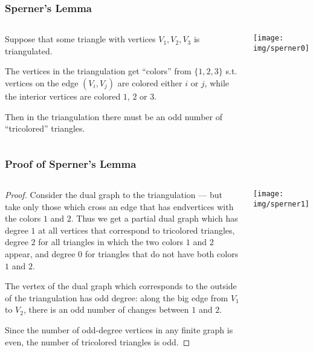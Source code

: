 \documentclass[UTF8,11pt,colorlinks,compress,openany]{beamer}%
\begin{document}
\begin{frame}\frametitle{Sperner's Lemma}
\begin{columns}
\begin{lemma}
Suppose that some triangle with vertices $V_1, V_2, V_3$ is triangulated.

The vertices in the triangulation get ``colors'' from $\{1,2,3\}$ s.t. vertices on the edge $(V_i,V_j)$ are colored either $i$ or $j$, while the interior vertices are colored $1$, $2$ or $3$.

Then in the triangulation there must be an odd number of ``tricolored'' triangles.
\end{lemma}
	\texttt{[image: img/sperner0]}
\end{columns}
\end{frame}

\begin{frame}\frametitle{Proof of Sperner's Lemma}
\begin{columns}
\vspace{-1ex}
\begin{proof}
Consider the dual graph to the triangulation --- but take only those which cross an edge that has endvertices with the colors $1$ and $2$. Thus we get a partial dual graph which has degree $1$ at all vertices that correspond to tricolored triangles, degree $2$ for all triangles in which the two colors $1$ and $2$ appear, and degree $0$ for triangles that do not have both colors $1$ and $2$.

The vertex of the dual graph which corresponds to the outside of the triangulation has odd degree: along the big edge from $V_1$ to $V_2$, there is an odd number of changes between $1$ and $2$.

Since the number of odd-degree vertices in any finite graph is even, the number of tricolored triangles is odd.
\end{proof}
	\texttt{[image: img/sperner1]}
\end{columns}
\end{frame}
\end{document}
